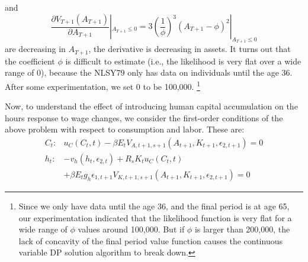 \documentclass{article}
\begin{document}
{           and
            \begin{equation*}
             \dfrac{\partial V_{T+1} (A_{T+1})}{\partial A_{T+1}}|_{A_{T+1} \leq 0} = 3 (\frac{1}{\phi})^3(A_{T+1}-\phi)^2|_{A_{T+1} \leq 0}
           \end{equation*}
           are decreasing in $A_{T+1}$, the derivative is decreasing in assets.
         } It turns out that the coefficient $\phi$ is difficult to estimate (i.e., the likelihood is very flat over a wide range of 0), because the NLSY79 only has data on individuals until the age 36. After some experimentation, we set 0 to be 100,000. \footnote[8]{Since we only have data until the age 36, and the final period is at age 65, our experimentation indicated that the likelihood function is very flat for a wide range of $\phi$ values around 100,000. But if $\phi$ is larger than 200,000, the lack of concavity of the final period value function causes the continuous variable DP solution algorithm to break down.} \par
         Now, to understand the effect of introducing human capital accumulation on the hours response to wage changes, we consider the first-order conditions of the above problem with respect to consumption and labor. These are:
         \begin{equation} \tag{9}
           \label{eq:FOC}
           \begin{split}
             C_t: &  u_C(C_t,t) - \beta E_t V_{A,t+1,s+1}(A_{t+1},K_{t+1},\epsilon_{2,t+1}) = 0 \\
             h_t: & -v_h(h_t,\epsilon_{2,t}) + R_sK_t u_C(C_t,t) \\
             & + \beta E_t g_h \epsilon_{1,t+1} V_{K,t+1,s+1}(A_{t+1},K_{t+1},\epsilon_{2,t+1})=0
           \end{split}
           \end{equation}
          
\end{document}
